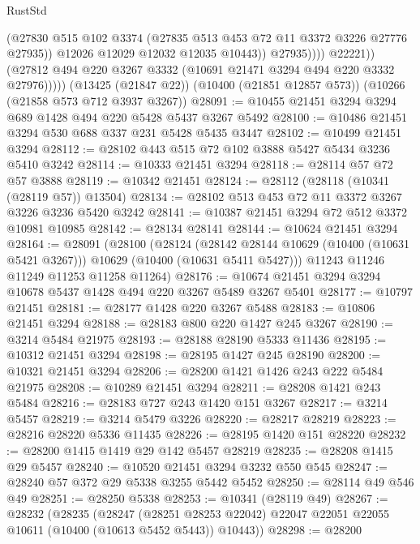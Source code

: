 \begin{lexlean}{RustStd}
\begin{coremodule}
                          (@27830
                            @515
                            @102
                            @3374
                            (@27835 @513 @453 @72 @11 @3372 @3226 @27776 @27935))
                          @12026
                          @12029
                          @12032
                          @12035
                          @10443))
                      @27935))))
              @22221))
          (@27812 @494 @220 @3267 @3332 (@10691 @21471 @3294 @494 @220 @3332 @27976)))))
    (@13425 (@21847 @22))
    (@10400 (@21851 @12857 @573))
    (@10266 (@21858 @573 @712 @3937 @3267))
@28091 := @10455 @21451 @3294 @3294 @689 @1428 @494 @220 @5428 @5437 @3267 @5492
@28100 := @10486 @21451 @3294 @530 @688 @337 @231 @5428 @5435 @3447
@28102 := @10499 @21451 @3294
@28112 := @28102 @443 @515 @72 @102 @3888 @5427 @5434 @3236 @5410 @3242
@28114 := @10333 @21451 @3294
@28118 := @28114 @57 @72 @57 @3888
@28119 := @10342 @21451
@28124 := @28112 (@28118 (@10341 (@28119 @57)) @13504)
@28134 := @28102 @513 @453 @72 @11 @3372 @3267 @3226 @3236 @5420 @3242
@28141 := @10387 @21451 @3294 @72 @512 @3372 @10981 @10985
@28142 := @28134 @28141
@28144 := @10624 @21451 @3294
@28164 := @28091
    (@28100
      (@28124
        (@28142 @28144 @10629 (@10400 (@10631 @5421 @3267)))
        @10629
        (@10400 (@10631 @5411 @5427)))
      @11243
      @11246
      @11249
      @11253
      @11258
      @11264)
@28176 := @10674 @21451 @3294 @3294 @10678 @5437 @1428 @494 @220 @3267 @5489 @3267 @5401
@28177 := @10797 @21451
@28181 := @28177 @1428 @220 @3267 @5488
@28183 := @10806 @21451 @3294
@28188 := @28183 @800 @220 @1427 @245 @3267
@28190 := @3214 @5484 @21975
@28193 := @28188 @28190 @5333 @11436
@28195 := @10312 @21451 @3294
@28198 := @28195 @1427 @245 @28190
@28200 := @10321 @21451 @3294
@28206 := @28200 @1421 @1426 @243 @222 @5484 @21975
@28208 := @10289 @21451 @3294
@28211 := @28208 @1421 @243 @5484
@28216 := @28183 @727 @243 @1420 @151 @3267
@28217 := @3214 @5457
@28219 := @3214 @5479 @3226
@28220 := @28217 @28219
@28223 := @28216 @28220 @5336 @11435
@28226 := @28195 @1420 @151 @28220
@28232 := @28200 @1415 @1419 @29 @142 @5457 @28219
@28235 := @28208 @1415 @29 @5457
@28240 := @10520 @21451 @3294 @3232 @550 @545
@28247 := @28240 @57 @372 @29 @5338 @3255 @5442 @5452
@28250 := @28114 @49 @546 @49
@28251 := @28250 @5338
@28253 := @10341 (@28119 @49)
@28267 := @28232
    (@28235
      (@28247
        (@28251 @28253 @22042)
        @22047
        @22051
        @22055
        @10611
        (@10400 (@10613 @5452 @5443))
        @10443))
@28298 := @28200

\end{coremodule}
\end{lexlean}
